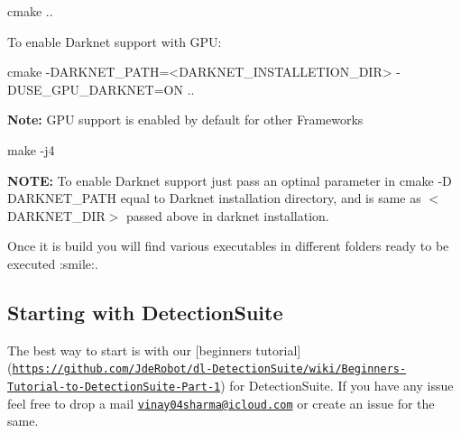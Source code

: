 \begin{DoxyCode}
cmake ..
\end{DoxyCode}
 To enable Darknet support with G\+PU\+: 
\begin{DoxyCode}
cmake -DARKNET\_PATH=<DARKNET\_INSTALLETION\_DIR> -DUSE\_GPU\_DARKNET=ON ..
\end{DoxyCode}
 {\bfseries Note\+:} G\+PU support is enabled by default for other Frameworks 
\begin{DoxyCode}
make -j4
\end{DoxyCode}


{\bfseries N\+O\+TE\+:} To enable Darknet support just pass an optinal parameter in cmake {\ttfamily -\/D D\+A\+R\+K\+N\+E\+T\+\_\+\+P\+A\+TH} equal to Darknet installation directory, and is same as {\ttfamily $<$D\+A\+R\+K\+N\+E\+T\+\_\+\+D\+IR$>$} passed above in darknet installation.

Once it is build you will find various executables in different folders ready to be executed \+:smile\+:.

\subsection*{Starting with Detection\+Suite}

The best way to start is with our \mbox{[}beginner\textquotesingle{}s tutorial\mbox{]}(\href{https://github.com/JdeRobot/dl-DetectionSuite/wiki/Beginner's-Tutorial-to-DetectionSuite-Part-1}{\tt https\+://github.\+com/\+Jde\+Robot/dl-\/\+Detection\+Suite/wiki/\+Beginner\textquotesingle{}s-\/\+Tutorial-\/to-\/\+Detection\+Suite-\/\+Part-\/1}) for Detection\+Suite. If you have any issue feel free to drop a mail \href{mailto:vinay04sharma@icloud.com}{\tt vinay04sharma@icloud.\+com} or create an issue for the same. 